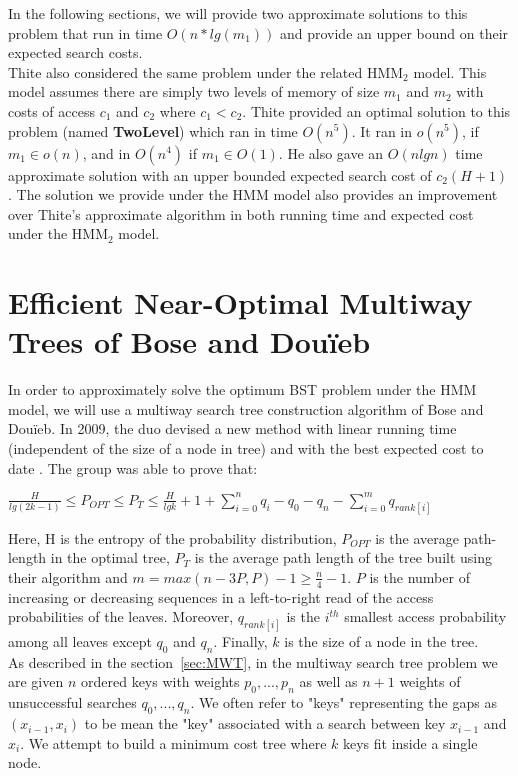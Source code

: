 \documentclass[letterpaper,12pt,titlepage,oneside,final]{book}
\theoremstyle{plain}
\begin{document}
 In the following sections, we will provide two approximate solutions to this problem that run in time $O(n*lg(m_1))$ and provide an upper bound on their expected search costs.  \\

Thite also considered the same problem under the related HMM$_2$ model. This model assumes there are simply two levels of memory of size $m_1$ and $m_2$ with costs of access $c_1$ and $c_2$ where $c_1 < c_2$. Thite provided an optimal solution to this problem (named \textbf{TwoLevel}) which ran in time $O(n^5)$. It ran in $o(n^5)$, if $m_1 \in o(n)$, and in $O(n^4)$ if $m_1 \in O(1)$. He also gave an $O(nlg n)$ time approximate solution with an upper bounded expected search cost of $c_2(H+1)$. The solution we provide under the HMM model also provides an improvement over Thite's approximate algorithm in both running time and expected cost under the HMM$_2$ model.


\section{Efficient Near-Optimal Multiway Trees of Bose and Dou\"{i}eb}\label{43}

In order to approximately solve the optimum BST problem under the HMM model, we will use a multiway search tree construction algorithm of Bose and Dou\"{i}eb. In 2009, the duo devised a new method with linear running time (independent of the size of a node in tree) and with the best expected cost to date \cite{bose2009efficient}. The group was able to prove that:
\begin{center}
$\frac{H}{lg(2k-1)} \leq P_{OPT} \leq P_T \leq \frac{H}{lg k} + 1 + \sum_{i=0}^n q_i - q_0 - q_n - \sum_{i=0}^m q_{rank[i]}$
\end{center}
Here, H is the entropy of the probability distribution, $P_{OPT}$ is the average path-length in the optimal tree, $P_T$ is the average path length of the tree built using their algorithm and $m=max({n-3P,P})-1 \geq \frac{n}{4} - 1$. $P$ is the number of increasing or decreasing sequences in a left-to-right read of the access probabilities of the leaves. Moreover, $q_{rank[i]}$ is the $i^{th}$ smallest access probability among all leaves except $q_0$ and $q_n$. Finally, $k$ is the size of a node in the tree. \\

As described in the section~\ref{sec:MWT}, in the multiway search tree problem we are given $n$ ordered keys with weights $p_0, ..., p_n$ as well as $n+1$ weights of unsuccessful searches $q_0,...,q_n$. We often refer to "keys" representing the gaps as $(x_{i-1},x_i)$ to be mean the "key" associated with a search between key $x_{i-1}$ and $x_i$. We attempt to build a minimum cost tree where $k$ keys fit inside a single node.\\
 
\end{document}
